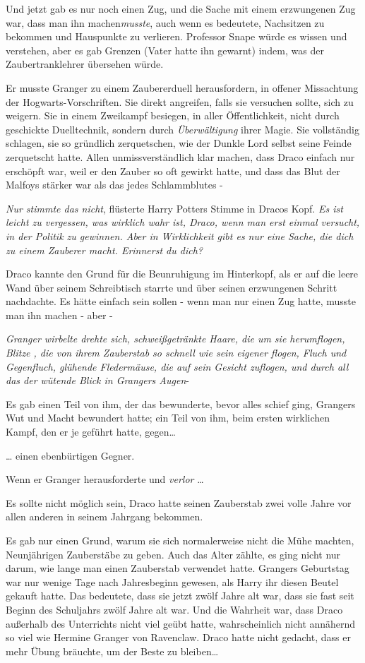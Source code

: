 {Und jetzt gab es nur noch einen Zug, und die Sache mit einem erzwungenen Zug war, dass man ihn machen\emph{musste}, auch wenn es bedeutete, Nachsitzen zu bekommen und Hauspunkte zu verlieren. Professor Snape würde es wissen und verstehen, aber es gab Grenzen (Vater hatte ihn gewarnt) indem, was der Zaubertranklehrer übersehen würde.

Er musste Granger zu einem Zaubererduell herausfordern, in offener Missachtung der Hogwarts-Vorschriften. Sie direkt angreifen, falls sie versuchen sollte, sich zu weigern. Sie in einem Zweikampf besiegen, in aller Öffentlichkeit, nicht durch geschickte Duelltechnik, sondern durch \emph{Überwältigung} ihrer Magie. Sie vollständig schlagen, sie so gründlich zerquetschen, wie der Dunkle Lord selbst seine Feinde zerquetscht hatte. Allen unmissverständlich klar machen, dass Draco einfach nur erschöpft war, weil er den Zauber so oft gewirkt hatte, und dass das Blut der Malfoys stärker war als das jedes Schlammblutes -

\emph{Nur stimmte das nicht}, flüsterte Harry Potters Stimme in Dracos Kopf. \emph{Es ist leicht zu vergessen, was wirklich wahr ist, Draco, wenn man erst einmal versucht, in der Politik zu gewinnen. Aber in Wirklichkeit gibt es nur eine Sache, die dich zu einem Zauberer macht. Erinnerst du dich?}

Draco kannte den Grund für die Beunruhigung im Hinterkopf, als er auf die leere Wand über seinem Schreibtisch starrte und über seinen erzwungenen Schritt nachdachte. Es hätte einfach sein sollen - wenn man nur einen Zug hatte, musste man ihn machen - aber -

\emph{Granger wirbelte drehte sich, schweißgetränkte Haare, die um sie herumflogen, Blitze , die von ihrem Zauberstab so schnell wie sein eigener flogen, Fluch und Gegenfluch, glühende Fledermäuse, die auf sein Gesicht zuflogen, und durch all das der wütende Blick in Grangers Augen}-

Es gab einen Teil von ihm, der das bewunderte, bevor alles schief ging, Grangers Wut und Macht bewundert hatte; ein Teil von ihm, beim ersten wirklichen Kampf, den er je geführt hatte, gegen…

… einen ebenbürtigen Gegner.

Wenn er Granger herausforderte und \emph{verlor} …

Es sollte nicht möglich sein, Draco hatte seinen Zauberstab zwei volle Jahre vor allen anderen in seinem Jahrgang bekommen.

Es gab nur einen Grund, warum sie sich normalerweise nicht die Mühe machten, Neunjährigen Zauberstäbe zu geben. Auch das Alter zählte, es ging nicht nur darum, wie lange man einen Zauberstab verwendet hatte. Grangers Geburtstag war nur wenige Tage nach Jahresbeginn gewesen, als Harry ihr diesen Beutel gekauft hatte. Das bedeutete, dass sie jetzt zwölf Jahre alt war, dass sie fast seit Beginn des Schuljahrs zwölf Jahre alt war. Und die Wahrheit war, dass Draco außerhalb des Unterrichts nicht viel geübt hatte, wahrscheinlich nicht annähernd so viel wie Hermine Granger von Ravenclaw. Draco hatte nicht gedacht, dass er mehr Übung bräuchte, um der Beste zu bleiben…

}
